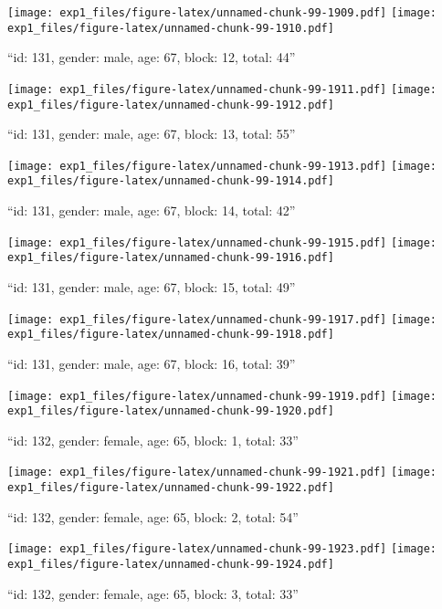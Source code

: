 \documentclass[,]{article}
\begin{document}
\texttt{[image: exp1\_files/figure-latex/unnamed-chunk-99-1909.pdf]}
\texttt{[image: exp1\_files/figure-latex/unnamed-chunk-99-1910.pdf]}

\newpage
[1] 

``id: 131, gender: male, age: 67, block: 12, total: 44''

\texttt{[image: exp1\_files/figure-latex/unnamed-chunk-99-1911.pdf]}
\texttt{[image: exp1\_files/figure-latex/unnamed-chunk-99-1912.pdf]}

\newpage
[1] 

``id: 131, gender: male, age: 67, block: 13, total: 55''

\texttt{[image: exp1\_files/figure-latex/unnamed-chunk-99-1913.pdf]}
\texttt{[image: exp1\_files/figure-latex/unnamed-chunk-99-1914.pdf]}

\newpage
[1] 

``id: 131, gender: male, age: 67, block: 14, total: 42''

\texttt{[image: exp1\_files/figure-latex/unnamed-chunk-99-1915.pdf]}
\texttt{[image: exp1\_files/figure-latex/unnamed-chunk-99-1916.pdf]}

\newpage
[1] 

``id: 131, gender: male, age: 67, block: 15, total: 49''

\texttt{[image: exp1\_files/figure-latex/unnamed-chunk-99-1917.pdf]}
\texttt{[image: exp1\_files/figure-latex/unnamed-chunk-99-1918.pdf]}

\newpage
[1] 

``id: 131, gender: male, age: 67, block: 16, total: 39''

\texttt{[image: exp1\_files/figure-latex/unnamed-chunk-99-1919.pdf]}
\texttt{[image: exp1\_files/figure-latex/unnamed-chunk-99-1920.pdf]}

\newpage
[1] 

``id: 132, gender: female, age: 65, block: 1, total: 33''

\texttt{[image: exp1\_files/figure-latex/unnamed-chunk-99-1921.pdf]}
\texttt{[image: exp1\_files/figure-latex/unnamed-chunk-99-1922.pdf]}

\newpage
[1] 

``id: 132, gender: female, age: 65, block: 2, total: 54''

\texttt{[image: exp1\_files/figure-latex/unnamed-chunk-99-1923.pdf]}
\texttt{[image: exp1\_files/figure-latex/unnamed-chunk-99-1924.pdf]}

\newpage
[1] 

``id: 132, gender: female, age: 65, block: 3, total: 33''
\end{document}
